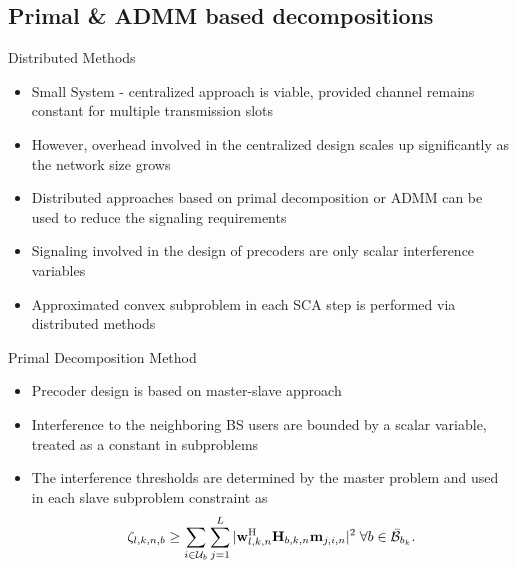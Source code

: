 \documentclass[9pt]{beamer}
\begin{document}
\subsection{Primal \& \acs{ADMM} based decompositions}

\begin{frame}{Distributed Methods}
	\begin{itemize}
		\item \alert{Small System - centralized approach is viable}, provided channel remains constant for multiple transmission slots
		\item However, overhead involved in the centralized design scales up significantly as the network size grows
		\item Distributed approaches based on primal decomposition or \acs{ADMM} can be used to reduce the signaling requirements
		\item Signaling involved in the design of precoders are only \alert{scalar interference variables}
		\item Approximated convex subproblem in each \acs{SCA} step is performed via distributed methods
	\end{itemize}
\end{frame}

\begin{frame}{Primal Decomposition Method}
	\begin{itemize}
		\item Precoder design is based on master-slave approach
		\item Interference to the neighboring \ac{BS} users are \alert{bounded by a scalar variable, treated as a constant in subproblems}
		\item The interference thresholds are determined by the master problem and used in each slave subproblem constraint as
		\begin{equation} \label{inter_exp} \scriptsize
		\zeta_{l,k,n,b} \geq \sum_{i \in \mathcal{U}_b} \sum_{j = 1}^L |\mathbf{w}_{l,k,n}^{\mathrm{H}} \mathbf{H}_{b,k,n} \mathbf{m}_{j,i,n} |^2 \; \forall b \in \bar{\mathcal{B}}_{b_k}.
		\end{equation}
	\end{itemize}
\end{frame}
\end{document}
